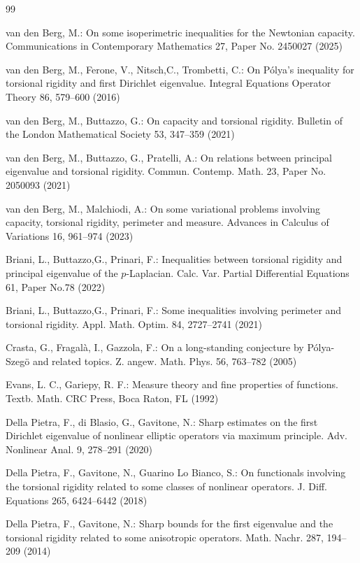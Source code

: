 \documentclass[a4paper,9pt]{article}
\begin{document}
\begin{thebibliography} {99}

 van den Berg, M.: On some isoperimetric inequalities for the Newtonian capacity. Communications in Contemporary Mathematics 27, Paper No. 2450027 (2025)

 van den Berg, M., Ferone, V., Nitsch,C., Trombetti, C.: On P\'olya's inequality for torsional rigidity and first Dirichlet eigenvalue. Integral Equations Operator Theory 86, 579--600 (2016)

 van den Berg, M., Buttazzo, G.: On capacity and torsional rigidity. Bulletin of the London Mathematical Society 53, 347--359 (2021)

 van den Berg, M., Buttazzo, G., Pratelli, A.: On relations between principal eigenvalue and torsional rigidity. Commun. Contemp. Math. 23, Paper No. 2050093 (2021)

 van den Berg, M., Malchiodi, A.: On some variational problems involving capacity, torsional rigidity, perimeter and measure. Advances in Calculus of Variations 16, 961--974 (2023)

 Briani, L., Buttazzo,G.,  Prinari, F.:  Inequalities between torsional rigidity and principal eigenvalue of the $p$-Laplacian. Calc. Var. Partial Differential Equations 61, Paper No.78 (2022)

 Briani, L., Buttazzo,G.,  Prinari, F.: Some inequalities involving perimeter and torsional rigidity. Appl. Math. Optim. 84,  2727--2741 (2021)

 Crasta, G., Fragal\`{a}, I., Gazzola, F.: On a long-standing conjecture by P\'{o}lya-Szeg\"{o} and related topics. Z. angew. Math. Phys. 56, 763--782 (2005)

 Evans, L. C., Gariepy, R. F.: Measure theory and fine properties of functions.
Textb. Math. CRC Press, Boca Raton, FL (1992)

 Della Pietra, F., di Blasio, G.,  Gavitone, N.: Sharp estimates on the first Dirichlet eigenvalue of nonlinear elliptic operators via maximum principle. Adv. Nonlinear Anal. 9, 278--291 (2020)

 Della Pietra, F., Gavitone, N., Guarino Lo Bianco, S.: On functionals involving the torsional rigidity related to some classes of nonlinear operators. J. Diff. Equations 265, 6424--6442 (2018)

 Della Pietra, F., Gavitone, N.: Sharp bounds for the first eigenvalue and the torsional rigidity related to some anisotropic operators. Math. Nachr. 287, 194--209 (2014)


\end{thebibliography}
\end{document}
